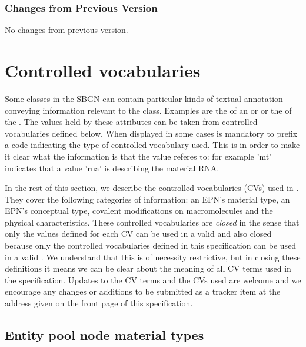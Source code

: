 \subsubsection{Changes from Previous Version}

No changes from previous version.

\section{Controlled vocabularies}\label{sec:CVs}


Some classes in the SBGN \PDl can contain particular kinds of textual
annotation conveying information relevant to the class.  Examples are
the  of an  or
 or the  of the
. The values held by these attributes can be
taken from controlled vocabularies defined below. When displayed in
some cases is mandatory to prefix a code indicating the type of
controlled vocabulary used.  This is in order to make it clear what
the information is that the value referes to: for example 'mt'
indicates that a value 'rna' is describing the material RNA.

In the rest of this section, we describe the controlled vocabularies
(CVs) used in \SBGNPDLone.  They cover the following categories of
information: an EPN's material type, an EPN's conceptual type,
covalent modifications on macromolecules and the physical
characteristics. These controlled vocabularies are \emph{closed} in
the sense that only the values defined for each CV can be used in a
valid \PDm and also closed because only the controlled vocabularies
defined in this specification can be used in a valid \PDm. We
understand that this is of necessity restrictive, but in closing these
definitions it means we can be clear about the meaning of all CV terms
used in the specification. Updates to the CV terms and the CVs used
are welcome and we encourage any changes or additions to be submitted
as a tracker item at the address given on the front page of this
specification.


\subsection{Entity pool node material types}
\label{sec:material-types-cv}

